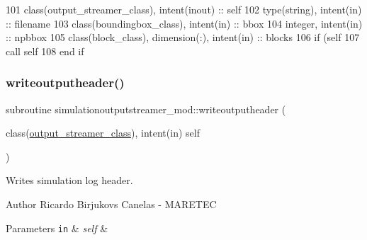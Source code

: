 \begin{DoxyCode}
101     \textcolor{keywordtype}{class}(output\_streamer\_class), \textcolor{keywordtype}{intent(inout)} :: self
102     \textcolor{keywordtype}{type}(string), \textcolor{keywordtype}{intent(in)} :: filename
103     \textcolor{keywordtype}{class}(boundingbox\_class), \textcolor{keywordtype}{intent(in)} :: bbox
104     \textcolor{keywordtype}{integer}, \textcolor{keywordtype}{intent(in)} :: npbbox
105     \textcolor{keywordtype}{class}(block\_class), \textcolor{keywordtype}{dimension(:)}, \textcolor{keywordtype}{intent(in)} :: blocks
106     \textcolor{keywordflow}{if} (self%
107         \textcolor{keyword}{call }self%
108 \textcolor{keywordflow}{    end if}
\end{DoxyCode}
\mbox{\label{namespacesimulationoutputstreamer__mod_a6f01bdc663fe5f4a842150a6aac90f67}} 
\subsubsection{\texorpdfstring{writeoutputheader()}{writeoutputheader()}}
{\footnotesize\ttfamily subroutine simulationoutputstreamer\+\_\+mod\+::writeoutputheader (\begin{DoxyParamCaption}\item[{class(\mbox{\hyperlink{structsimulationoutputstreamer__mod_1_1output__streamer__class}{output\+\_\+streamer\+\_\+class}}), intent(in)}]{self }\end{DoxyParamCaption})\hspace{0.3cm}{\ttfamily [private]}}



Writes simulation log header. 

\begin{DoxyAuthor}{Author}
Ricardo Birjukovs Canelas -\/ M\+A\+R\+E\+T\+EC 
\end{DoxyAuthor}

\begin{DoxyParams}[1]{Parameters}
\mbox{\tt in}  & {\em self} & \\
\hline
\end{DoxyParams}


